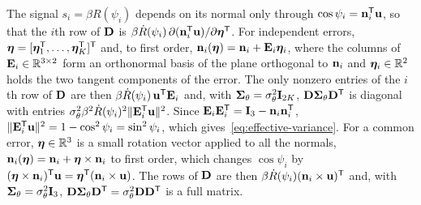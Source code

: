The signal $s_i=\beta R(\psi_i)$ depends on its normal only through $\cos\psi_i=\mathbf{n}_i^{\mathsf T}\mathbf{u}$, so that the $i$th row of $\mathbf{D}$ is $\beta\dot R(\psi_i)\,\partial(\mathbf{n}_i^{\mathsf T}\mathbf{u})/\partial\bm\eta^{\mathsf T}$. For independent errors, $\bm\eta=[\bm\eta_1^{\mathsf T},\ldots,\bm\eta_K^{\mathsf T}]^{\mathsf T}$ and, to first order, $\mathbf{n}_i(\bm\eta)=\mathbf{n}_i+\mathbf{E}_i\bm\eta_i$, where the columns of $\mathbf{E}_i\in\mathbb R^{3\times2}$ form an orthonormal basis of the plane orthogonal to $\mathbf{n}_i$ and $\bm\eta_i\in\mathbb R^2$ holds the two tangent components of the error. The only nonzero entries of the $i$th row of $\mathbf{D}$ are then $\beta\dot R(\psi_i)\,\mathbf{u}^{\mathsf T}\mathbf{E}_i$ and, with $\bm\Sigma_\theta=\sigma_\theta^2\mathbf{I}_{2K}$, $\mathbf{D}\bm\Sigma_\theta\mathbf{D}^{\mathsf T}$ is diagonal with entries $\sigma_\theta^2\beta^2\dot R(\psi_i)^2\lVert\mathbf{E}_i^{\mathsf T}\mathbf{u}\rVert^2$. Since $\mathbf{E}_i\mathbf{E}_i^{\mathsf T}=\mathbf{I}_3-\mathbf{n}_i\mathbf{n}_i^{\mathsf T}$, $\lVert\mathbf{E}_i^{\mathsf T}\mathbf{u}\rVert^2=1-\cos^2\psi_i=\sin^2\psi_i$, which gives~\eqref{eq:effective-variance}. For a common error, $\bm\eta\in\mathbb R^3$ is a small rotation vector applied to all the normals, $\mathbf{n}_i(\bm\eta)=\mathbf{n}_i+\bm\eta\times\mathbf{n}_i$ to first order, which changes $\cos\psi_i$ by $(\bm\eta\times\mathbf{n}_i)^{\mathsf T}\mathbf{u}=\bm\eta^{\mathsf T}(\mathbf{n}_i\times\mathbf{u})$. The rows of $\mathbf{D}$ are then $\beta\dot R(\psi_i)(\mathbf{n}_i\times\mathbf{u})^{\mathsf T}$ and, with $\bm\Sigma_\theta=\sigma_\theta^2\mathbf{I}_3$, $\mathbf{D}\bm\Sigma_\theta\mathbf{D}^{\mathsf T}=\sigma_\theta^2\mathbf{D}\mathbf{D}^{\mathsf T}$ is a full matrix.
